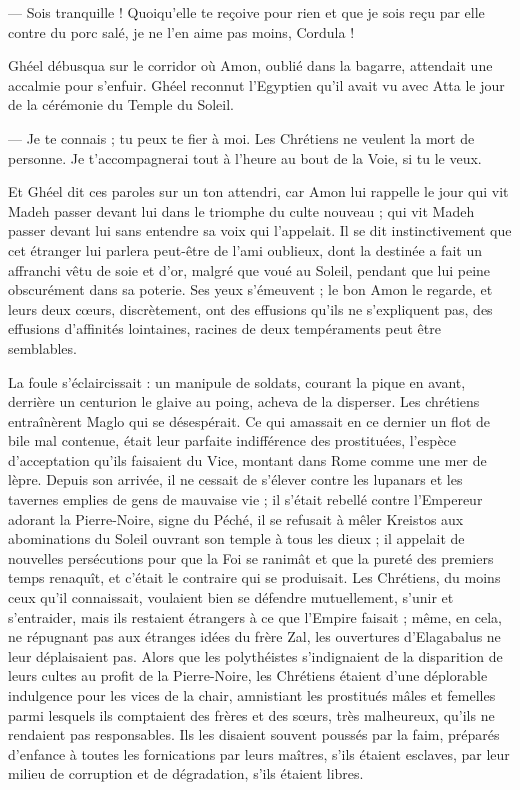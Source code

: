 \documentclass[a4paper, 11pt, oneside, polutonikogreek, french]{article}
\begin{document}
--- Sois tranquille ! Quoiqu'elle te reçoive pour rien et que je sois reçu par elle contre du porc salé, je ne l'en aime pas moins, Cordula !

Ghéel débusqua sur le corridor où Amon, oublié dans la bagarre, attendait une accalmie pour s'enfuir. Ghéel reconnut l'Egyptien qu'il avait vu avec Atta le jour de la cérémonie du Temple du Soleil.

--- Je te connais ; tu peux te fier à moi. Les Chrétiens ne veulent la mort de personne. Je t'accompagnerai tout à l'heure au bout de la Voie, si tu le veux.

Et Ghéel dit ces paroles sur un ton attendri, car Amon lui rappelle le jour qui vit Madeh passer devant lui dans le triomphe du culte nouveau ; qui vit Madeh passer devant lui sans entendre sa voix qui l'appelait. Il se dit instinctivement que cet étranger lui parlera peut-être de l'ami oublieux, dont la destinée a fait un affranchi vêtu de soie et d'or, malgré que voué au Soleil, pendant que lui peine obscurément dans sa poterie. Ses yeux s'émeuvent ; le bon Amon le regarde, et leurs deux cœurs, discrètement, ont des effusions qu'ils ne s'expliquent pas, des effusions d'affinités lointaines, racines de deux tempéraments peut être semblables.

La foule s'éclaircissait : un manipule de soldats, courant la pique en avant, derrière un centurion le glaive au poing, acheva de la disperser. Les chrétiens entraînèrent Maglo qui se désespérait. Ce qui amassait en ce dernier un flot de bile mal contenue, était leur parfaite indifférence des prostituées, l'espèce d'acceptation qu'ils faisaient du Vice, montant dans Rome comme une mer de lèpre. Depuis son arrivée, il ne cessait de s'élever contre les lupanars et les tavernes emplies de gens de mauvaise vie ; il s'était rebellé contre l'Empereur adorant la Pierre-Noire, signe du Péché, il se refusait à mêler Kreistos aux abominations du Soleil ouvrant son temple à tous les dieux ; il appelait de nouvelles persécutions pour que la Foi se ranimât et que la pureté des premiers temps renaquît, et c'était le contraire qui se produisait. Les Chrétiens, du moins ceux qu'il connaissait, voulaient bien se défendre mutuellement, s'unir et s'entraider, mais ils restaient étrangers à ce que l'Empire faisait ; même, en cela, ne répugnant pas aux étranges idées du frère Zal, les ouvertures d'Elagabalus ne leur déplaisaient pas. Alors que les polythéistes s'indignaient de la disparition de leurs cultes au profit de la Pierre-Noire, les Chrétiens étaient d'une déplorable indulgence pour les vices de la chair, amnistiant les prostitués mâles et femelles parmi lesquels ils comptaient des frères et des sœurs, très malheureux, qu'ils ne rendaient pas responsables. Ils les disaient souvent poussés par la faim, préparés d'enfance à toutes les fornications par leurs maîtres, s'ils étaient esclaves, par leur milieu de corruption et de dégradation, s'ils étaient libres.
\clearpage
\end{document}

